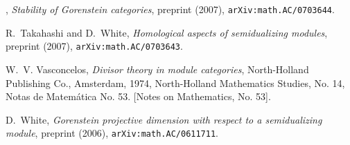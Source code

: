 \documentclass{amsart}
\begin{document}
\begin{thebibliography}{10}
\bysame, \emph{Stability of {G}orenstein categories}, preprint (2007),
  \texttt{arXiv:math.AC/0703644}.

R.~Takahashi and D.~White, \emph{Homological aspects of semidualizing modules},
  preprint (2007), \texttt{arXiv:math.AC/0703643}.

W.~V. Vasconcelos, \emph{Divisor theory in module categories}, North-Holland
  Publishing Co., Amsterdam, 1974, North-Holland Mathematics Studies, No. 14,
  Notas de Matem\'atica No. 53. [Notes on Mathematics, No. 53]. 

D.~White, \emph{Gorenstein projective dimension with respect to a semidualizing
  module}, preprint (2006), \texttt{arXiv:math.AC/0611711}.

\end{thebibliography}
\end{document}
